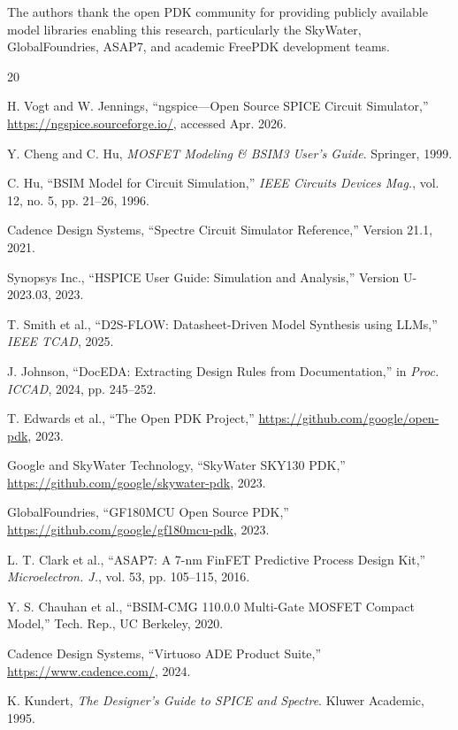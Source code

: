 \documentclass[conference]{IEEEtran}
\begin{document}
The authors thank the open PDK community for providing publicly available model libraries enabling this research, particularly the SkyWater, GlobalFoundries, ASAP7, and academic FreePDK development teams.

\balance

\begin{thebibliography}{20}

H. Vogt and W. Jennings, ``ngspice---Open Source SPICE Circuit Simulator,'' 
\url{https://ngspice.sourceforge.io/}, accessed Apr. 2026.

Y. Cheng and C. Hu, \textit{MOSFET Modeling \& BSIM3 User's Guide}. 
Springer, 1999.

C. Hu, ``BSIM Model for Circuit Simulation,'' 
\textit{IEEE Circuits Devices Mag.}, vol. 12, no. 5, pp. 21--26, 1996.

Cadence Design Systems, ``Spectre Circuit Simulator Reference,''
Version 21.1, 2021.

Synopsys Inc., ``HSPICE User Guide: Simulation and Analysis,''
Version U-2023.03, 2023.

T. Smith et al., ``D2S-FLOW: Datasheet-Driven Model Synthesis using LLMs,''
\textit{IEEE TCAD}, 2025.

J. Johnson, ``DocEDA: Extracting Design Rules from Documentation,''
in \textit{Proc. ICCAD}, 2024, pp. 245--252.

T. Edwards et al., ``The Open PDK Project,''
\url{https://github.com/google/open-pdk}, 2023.

Google and SkyWater Technology, ``SkyWater SKY130 PDK,''
\url{https://github.com/google/skywater-pdk}, 2023.

GlobalFoundries, ``GF180MCU Open Source PDK,''
\url{https://github.com/google/gf180mcu-pdk}, 2023.

L. T. Clark et al., ``ASAP7: A 7-nm FinFET Predictive Process Design Kit,''
\textit{Microelectron. J.}, vol. 53, pp. 105--115, 2016.

Y. S. Chauhan et al., ``BSIM-CMG 110.0.0 Multi-Gate MOSFET Compact Model,''
Tech. Rep., UC Berkeley, 2020.

Cadence Design Systems, ``Virtuoso ADE Product Suite,''
\url{https://www.cadence.com/}, 2024.

K. Kundert, \textit{The Designer's Guide to SPICE and Spectre}.
Kluwer Academic, 1995.


\end{thebibliography}
\end{document}
